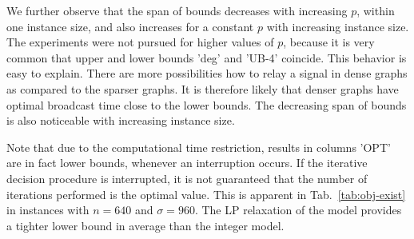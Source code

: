 We further observe that the span of bounds decreases with increasing $p$, within one instance size, and also increases for a constant $p$ with increasing instance size.
The experiments were not pursued for higher values of $p$, because it is very common that upper and lower bounds 'deg' and 'UB-4' coincide.
This behavior is easy to explain.
There are more possibilities how to relay a signal in dense graphs as compared to the sparser graphs. 
It is therefore likely that denser graphs have optimal broadcast time close to the lower bounds.
The decreasing span of bounds is also noticeable with increasing instance size.

Note that due to the computational time restriction, results in columns 'OPT' are in fact lower bounds, whenever an interruption occurs.
If the iterative decision procedure is interrupted, it is not guaranteed that the number of iterations performed is the optimal value.
This is apparent in Tab.~\ref{tab:obj-exist} in instances with $n=640$ and $\sigma=960$. 
The LP relaxation of the model provides a tighter lower bound in average than the integer model.

